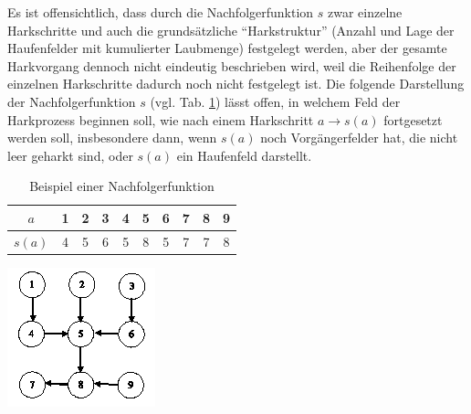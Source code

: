 \documentclass[fontsize=12pt,doubleside,openany,listof=totoc,listof=flat,listof=nochaptergap,numbers=noenddot]{scrbook}
\theoremstyle{style}
\begin{document}
\noindent Es ist offensichtlich, dass durch die Nachfolgerfunktion $s$ zwar einzelne Harkschritte und auch die grundsätzliche "`Harkstruktur"' (Anzahl und Lage der Haufenfelder mit kumulierter Laubmenge) festgelegt werden, aber der gesamte Harkvorgang dennoch nicht eindeutig beschrieben wird, weil die Reihenfolge der einzelnen Harkschritte dadurch noch nicht festgelegt ist. Die folgende Darstellung der Nachfolgerfunktion $s$ (vgl. Tab. \ref{table_Beispiel_Nachfolgerfunktion}) lässt offen, in welchem Feld der Harkprozess beginnen soll, wie nach einem Harkschritt $a \rightarrow s(a)$ fortgesetzt werden soll, insbesondere dann, wenn $s(a)$ noch Vorgängerfelder hat, die nicht leer geharkt sind, oder $s(a)$ ein Haufenfeld darstellt.

\renewcommand{\arraystretch}{1}
\begin{table}[H]
\caption{Beispiel einer Nachfolgerfunktion}
\label{table_Beispiel_Nachfolgerfunktion}
\centering 
\begin{tabular}{|>{}c|>{}c|>{}c|>{}c|>{}c|>{}c|>{}c|>{}c|>{}c|>{}c|}
\hline
$a$ & 1&2 &3 &4 &5 & 6 & 7 & 8 & 9\\
\hline
$s(a)$ & 4 &  5 & 6 & 5 & 8 & 5 & 7 & 7 & 8\\
\hline
\end{tabular}
\end{table}
\renewcommand{\arraystretch}{1}

\begin{center}
\begin{minipage}{\textwidth}
\centerline{\includegraphics[angle=0,scale=1.1]{Figures/Laub/Digraph_zur_Nachfolgerfunktion.png}}
\label{Digraph_zur_Nachfolgerfunktion}
\end{minipage}
\end{center}
\end{document}
